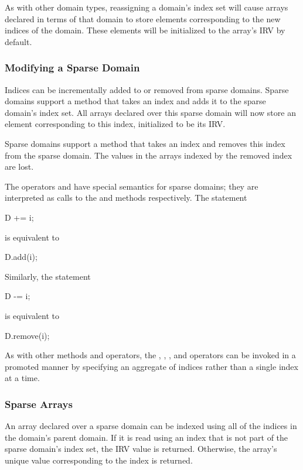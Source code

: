 As with other domain types, reassigning a domain's index set will
cause arrays declared in terms of that domain to store elements
corresponding to the new indices of the domain.  These elements will
be initialized to the array's IRV by default.



\subsubsection{Modifying a Sparse Domain}

Indices can be incrementally added to or removed from sparse domains.
Sparse domains support a method  that takes an index and
adds it to the sparse domain's index set.  All arrays declared over
this sparse domain will now store an element corresponding to this
index, initialized to be its IRV.

Sparse domains support a method  that takes an index and
removes this index from the sparse domain.  The values in the arrays
indexed by the removed index are lost.

The operators \chpl{+=} and \chpl{-=} have special semantics for
sparse domains; they are interpreted as calls to the 
and  methods respectively.  The statement
\begin{chapel}
D += i;
\end{chapel}
is equivalent to
\begin{chapel}
D.add(i);
\end{chapel}
Similarly, the statement
\begin{chapel}
D -= i;
\end{chapel}
is equivalent to
\begin{chapel}
D.remove(i);
\end{chapel}

As with other methods and operators, the , ,
\chpl{+=}, and \chpl{-=} operators can be invoked in a promoted manner
by specifying an aggregate of indices rather than a single index at a
time.

\subsubsection{Sparse Arrays}

An array declared over a sparse domain can be indexed using all of the
indices in the domain's parent domain.  If it is read using an index
that is not part of the sparse domain's index set, the IRV value is
returned.  Otherwise, the array's unique value corresponding to the
index is returned.


